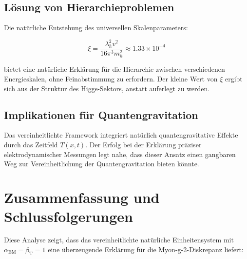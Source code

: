 \documentclass[12pt,a4paper]{article}
\newcommand{\Tfieldt}{T(x,t)}
\newcommand{\alphaEM}{\alpha_{\text{EM}}}
\newcommand{\betaT}{\beta_{\text{T}}}
\newcommand{\xipar}{\xi}
\begin{document}
	\subsection{Lösung von Hierarchieproblemen}
	\label{subsec:hierarchy_resolution}
	
	Die natürliche Entstehung des universellen Skalenparameters:
	
	\begin{equation}
		\xipar = \frac{\lambda_h^2 v^2}{16\pi^3 m_h^2} \approx 1.33 \times 10^{-4}
	\end{equation}
	
	bietet eine natürliche Erklärung für die Hierarchie zwischen verschiedenen Energieskalen, ohne Feinabstimmung zu erfordern. Der kleine Wert von $\xipar$ ergibt sich aus der Struktur des Higgs-Sektors, anstatt auferlegt zu werden.
	
	\subsection{Implikationen für Quantengravitation}
	\label{subsec:quantum_gravity}
	
	Das vereinheitlichte Framework integriert natürlich quantengravitative Effekte durch das Zeitfeld $\Tfieldt$. Der Erfolg bei der Erklärung präziser elektrodynamischer Messungen legt nahe, dass dieser Ansatz einen gangbaren Weg zur Vereinheitlichung der Quantengravitation bieten könnte.
	
	\section{Zusammenfassung und Schlussfolgerungen}
	
	Diese Analyse zeigt, dass das vereinheitlichte natürliche Einheitensystem mit $\alphaEM = \betaT = 1$ eine überzeugende Erklärung für die Myon-g-2-Diskrepanz liefert:
	
\end{document}

